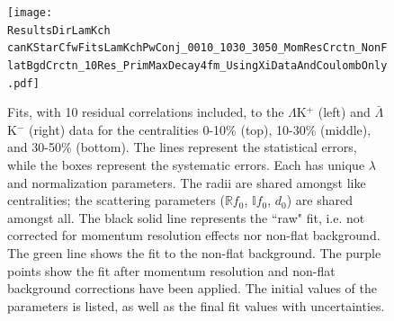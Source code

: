 \documentclass[../AnalysisNoteJBuxton.tex]{subfiles}
\begin{document}
\begin{figure}[h]
  \centering
  \texttt{[image: \\ResultsDirLamKch canKStarCfwFitsLamKchPwConj\_0010\_1030\_3050\_MomResCrctn\_NonFlatBgdCrctn\_10Res\_PrimMaxDecay4fm\_UsingXiDataAndCoulombOnly.pdf]}
  \caption[$\Lambda$K$^{+}$($\bar{\Lambda}$K$^{-}$) Fits with 10 Residuals]{Fits, with 10 residual correlations included, to the $\Lambda$K$^{+}$ (left) and $\bar{\Lambda}$K$^{-}$ (right) data for the centralities 0-10\% (top), 10-30\% (middle), and 30-50\% (bottom).
The lines represent the statistical errors, while the boxes represent the systematic errors.  
Each has unique $\lambda$ and normalization parameters.
The radii are shared amongst like centralities; the scattering parameters ($\mathbb{R}f_{0}$, $\mathbb{I}f_{0}$, $d_{0}$) are shared amongst all.
The black solid line represents the ``raw" fit, i.e. not corrected for momentum resolution effects nor non-flat background.  
The green line shows the fit to the non-flat background.
The purple points show the fit after momentum resolution and non-flat background corrections have been applied.
The initial values of the parameters is listed, as well as the final fit values with uncertainties.}
  \label{fig:LamKchPwConjFits_10Res}
\end{figure}

\end{document}
